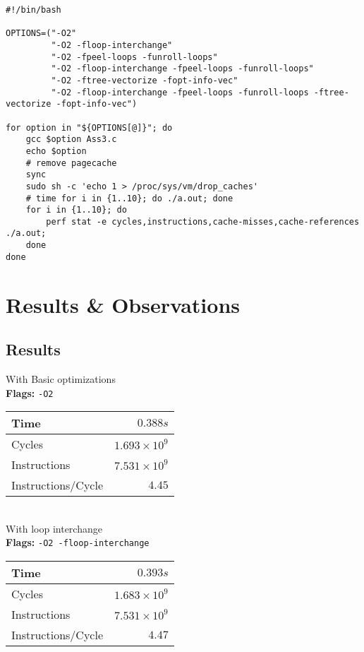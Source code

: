 \documentclass[12pt, letterpaper]{article}
\begin{document}
\begin{verbatim}
#!/bin/bash

OPTIONS=("-O2"
         "-O2 -floop-interchange"
         "-O2 -fpeel-loops -funroll-loops"
         "-O2 -floop-interchange -fpeel-loops -funroll-loops"
         "-O2 -ftree-vectorize -fopt-info-vec"
         "-O2 -floop-interchange -fpeel-loops -funroll-loops -ftree-vectorize -fopt-info-vec")

for option in "${OPTIONS[@]}"; do
    gcc $option Ass3.c
    echo $option
    # remove pagecache
    sync
    sudo sh -c 'echo 1 > /proc/sys/vm/drop_caches'
    # time for i in {1..10}; do ./a.out; done
    for i in {1..10}; do
        perf stat -e cycles,instructions,cache-misses,cache-references ./a.out;
    done
done
\end{verbatim}

\section{Results \& Observations}
\label{sec:res}

\subsection{Results}
\label{sec:res1}

With Basic optimizations\\
\textbf{Flags:} \verb~-O2~\\
\begin{tabular}{|l|r|}
  \hline
  Time& $0.388s$\\
  \hline
  Cycles& $1.693 \times 10^9$\\
  \hline
  Instructions& $7.531 \times 10^9$\\
  \hline
  Instructions/Cycle & $4.45$\\
  \hline
\end{tabular}\\

With loop interchange\\
\textbf{Flags:} \verb~-O2 -floop-interchange~\\
\begin{tabular}{|l|r|}
  \hline
  Time& $0.393s$\\
  \hline
  Cycles& $1.683 \times 10^9$\\
  \hline
  Instructions& $7.531 \times 10^9$\\
  \hline
  Instructions/Cycle & $4.47$\\
  \hline
\end{tabular}\\
\end{document}
